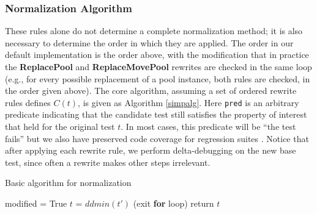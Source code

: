 \subsubsection{Normalization Algorithm}
\label{formalexample}

These rules alone do not determine a complete normalization method; it is
also necessary to determine the order in which they are applied.  The
order in our default implementation is the order above, with the
modification that in practice the {\bf ReplacePool} and {\bf
  ReplaceMovePool} rewrites are checked in the same loop
(e.g., for every possible replacement of a pool instance, both rules are
checked, in the order given above).  The core algorithm, assuming a set
of ordered rewrite rules defines $C(t)$, is given as Algorithm
\ref{simpalg}.  Here {\tt pred} is an arbitrary predicate indicating
that the candidate test still satisfies the property of interest that
held for the original test $t$.  In most cases, this predicate will be
``the test fails'' but we also have preserved
code coverage for regression suites \cite{icst2014}.  Notice that
after applying each rewrite rule, we perform delta-debugging on the
new base test, since often a rewrite makes other steps irrelevant.

\begin{algorithm}
\caption{Basic algorithm for normalization}
\label{simpalg}
{\scriptsize
\begin{algorithmic}[1]
\State modified = True 
\State $t$ = $ddmin(t')$
 (exit {\bf for} loop) 
\EndIf 
\EndFor 
\EndWhile 
\State return $t$
\end{algorithmic}
}
\end{algorithm}

